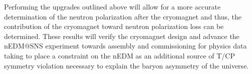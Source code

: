 Performing the upgrades outlined above will allow for a more accurate determination of the neutron polarization after the cryomagnet and thus, the contribution of the cryomagnet toward neutron polarization loss can be determined. These results will verify the cryomagnet design and advance the nEDM@SNS experiment towards assembly and commissioning for physics data taking to place a constraint on the nEDM as an additional source of T/CP symmetry violation necessary to explain the baryon asymmetry of the universe.